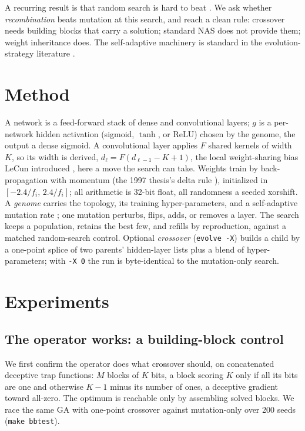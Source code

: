 \documentclass[11pt]{article}
\begin{document}
A recurring result is that random search is hard to beat \cite{bergstra2012,li2019}.
We ask whether \emph{recombination} beats mutation at this search, and reach a clean
rule: crossover needs building blocks that carry a solution; standard NAS does not
provide them; weight inheritance does. The self-adaptive machinery is standard in the
evolution-strategy literature \cite{rechenberg1973}.

\section{Method}

A network is a feed-forward stack of dense and convolutional layers; $g$ is a
per-network hidden activation (sigmoid, $\tanh$, or ReLU) chosen by the genome, the
output a dense sigmoid. A convolutional layer applies $F$ shared kernels of width $K$,
so its width is derived, $d_\ell = F(d_{\ell-1}-K+1)$, the local weight-sharing bias
LeCun introduced \cite{lecun1989}, here a move the search can take. Weights train by
back-propagation with momentum (the 1997 thesis's delta rule \cite{thesis1997}),
initialized in $[-2.4/f_i,\,2.4/f_i]$; all arithmetic is 32-bit float, all randomness a
seeded xorshift. A \emph{genome} carries the topology, its training hyper-parameters,
and a self-adaptive mutation rate \cite{rechenberg1973}; one mutation perturbs, flips,
adds, or removes a layer. The search keeps a population, retains the best few, and
refills by reproduction, against a matched random-search control. Optional
\emph{crossover} (\texttt{evolve -X}) builds a child by a one-point splice of two
parents' hidden-layer lists plus a blend of hyper-parameters; with \texttt{-X 0} the
run is byte-identical to the mutation-only search.

\section{Experiments}

\subsection{The operator works: a building-block control}

We first confirm the operator does what crossover should, on concatenated deceptive
trap functions: $M$ blocks of $K$ bits, a block scoring $K$ only if all its bits are
one and otherwise $K-1$ minus its number of ones, a deceptive gradient toward all-zero.
The optimum is reachable only by assembling solved blocks. We race the same GA with
one-point crossover against mutation-only over 200 seeds (\texttt{make bbtest}).
\end{document}

